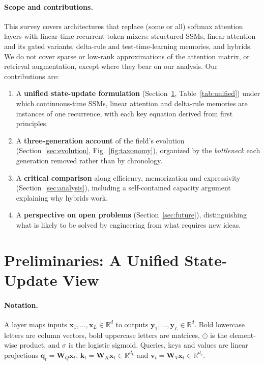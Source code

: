 \documentclass[a4paper]{article}
\newcommand{\R}{\mathbb{R}}
\newcommand{\vq}{\mathbf{q}}
\newcommand{\vk}{\mathbf{k}}
\newcommand{\vv}{\mathbf{v}}
\newcommand{\vx}{\mathbf{x}}
\newcommand{\vy}{\mathbf{y}}
\theoremstyle{plain}
\theoremstyle{remark}
\begin{document}
\paragraph{Scope and contributions.} This survey covers architectures that replace (some or all) softmax attention layers with linear-time recurrent token mixers: structured SSMs, linear attention and its gated variants, delta-rule and test-time-learning memories, and hybrids. We do not cover sparse or low-rank approximations of the attention matrix, or retrieval augmentation, except where they bear on our analysis. Our contributions are:
\begin{enumerate}
  \item A \textbf{unified state-update formulation} (Section~\ref{sec:prelim}, Table~\ref{tab:unified}) under which continuous-time SSMs, linear attention and delta-rule memories are instances of one recurrence, with each key equation derived from first principles.
  \item A \textbf{three-generation account} of the field's evolution (Section~\ref{sec:evolution}, Fig.~\ref{fig:taxonomy}), organized by the \emph{bottleneck} each generation removed rather than by chronology.
  \item A \textbf{critical comparison} along efficiency, memorization and expressivity (Section~\ref{sec:analysis}), including a self-contained capacity argument explaining why hybrids work.
  \item A \textbf{perspective on open problems} (Section~\ref{sec:future}), distinguishing what is likely to be solved by engineering from what requires new ideas.
\end{enumerate}

\section{Preliminaries: A Unified State-Update View}
\label{sec:prelim}

\paragraph{Notation.} A layer maps inputs $\vx_1,\dots,\vx_L\in\R^d$ to outputs $\vy_1,\dots,\vy_L\in\R^d$. Bold lowercase letters are column vectors, bold uppercase letters are matrices, $\odot$ is the element-wise product, and $\sigma$ is the logistic sigmoid. Queries, keys and values are linear projections $\vq_t=\mathbf{W}_Q\vx_t$, $\vk_t=\mathbf{W}_K\vx_t\in\R^{d_k}$ and $\vv_t=\mathbf{W}_V\vx_t\in\R^{d_v}$.
\end{document}
